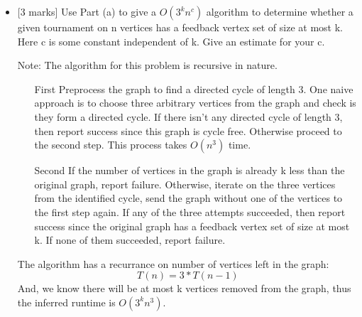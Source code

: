\documentclass[12pt]{article}
\begin{document}
\begin{enumerate}
\begin{itemize}
\item{}[3 marks]
Use Part (a) to give a $O(3^{k}n^{c})$ algorithm to determine whether a given tournament on n vertices has a feedback vertex set of size at most k. Here c is some constant independent of k. Give an estimate for your c.

Note: The algorithm for this problem is recursive in nature.
\begin{itemize}
\item[First]
Preprocess the graph to find a directed cycle of length 3. One naive approach is to choose three arbitrary vertices from the graph and check is they form a directed cycle. If there isn't any directed cycle of length 3, then report success since this graph is cycle free. Otherwise proceed to the second step. This process takes $O(n^{3})$ time.

\item[Second]
If the number of vertices in the graph is already k less than the original graph, report failure. Otherwise, iterate on the three vertices from the identified cycle, send the graph without one of the vertices to the first step again. If any of the three attempts succeeded, then report success since the original graph has a feedback vertex set of size at most k. If none of them succeeded, report failure.
\end{itemize}

The algorithm has a recurrance on number of vertices left in the graph:
\begin{equation}
T(n) = 3 * T(n-1)
\end{equation}
And, we know there will be at most k vertices removed from the graph, thus the inferred runtime is $O(3^{k}n^{3})$.



\end{itemize}

\end{enumerate}
\end{document}
